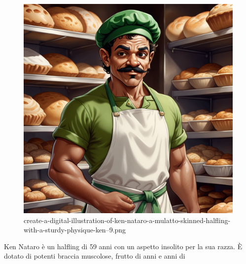 \begin{figure}
\centering
\includegraphics{create-a-digital-illustration-of-ken-nataro-a-mulatto-skinned-halfling-with-a-sturdy-physique-ken--9.png}
\caption{create-a-digital-illustration-of-ken-nataro-a-mulatto-skinned-halfling-with-a-sturdy-physique-ken--9.png}
\end{figure}

Ken Nataro è un halfling di 59 anni con un aspetto insolito per la sua
razza. È dotato di potenti braccia muscolose, frutto di anni e anni di
